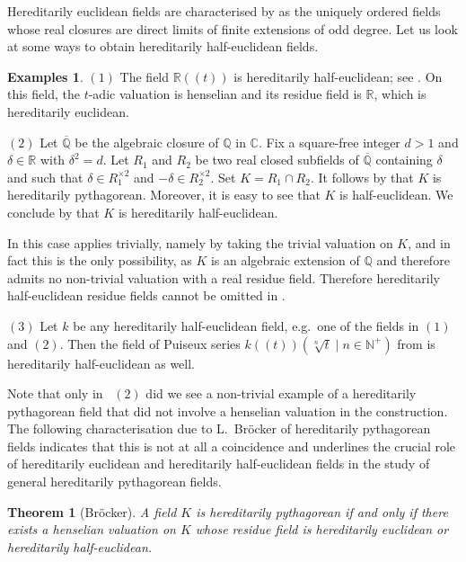 \documentclass[12pt,leqno]{amsart}
\newcommand{\qq}{\mathbb Q}
\newcommand{\cc}{\mathbb C}
\newcommand{\nat}{\mathbb{N}}
\newcommand{\rr}{\mathbb R}
\newcommand{\sq}[1]{#1^{\times 2}}
\newcommand{\ovl}{\overline}
\numberwithin{equation}{section}
\newtheorem{thm}[equation]{Theorem}
\theoremstyle{definition}
\newtheorem{exs}[equation]{Examples}
\theoremstyle{plain}
\begin{document}
Hereditarily euclidean fields are characterised by \cite[Satz 1.2]{PZ75} as the uniquely ordered fields whose real closures are direct limits of finite extensions of odd degree.
Let us look at some ways to obtain hereditarily half-euclidean fields.

\begin{exs}\label{EX:he}
$(1)$ The field $\rr(\!(t)\!)$ is hereditarily half-euclidean; see .
On this field, the $t$-adic valuation is henselian and its residue field is $\rr$, which is hereditarily euclidean.

$(2)$ Let $\ovl{\qq}$ be the algebraic closure of $\qq$ in $\cc$.
Fix a square-free integer $d>1$ and $\delta\in\rr$ with $\delta^2=d$.
Let $R_1$ and $R_2$ be two real closed subfields of $\ovl{\qq}$ containing $\delta$ and such that $\delta\in\sq{R}_1$ and $-\delta\in\sq{R}_2$.
Set $K=R_1\cap R_2$. It follows by \cite[Chap.~IV, Theorem~1]{Bec78} that $K$ is hereditarily pythagorean. 
Moreover, it is easy to see that $K$ is half-euclidean.
We conclude by  that $K$ is hereditarily half-euclidean. 

In this case  applies trivially, namely by taking the trivial valuation on $K$, and in fact this is the only possibility, as $K$ is an algebraic extension of $\qq$ and therefore admits no non-trivial valuation with a real residue field. 
Therefore hereditarily half-euclidean residue fields cannot be omitted in .

$(3)$ Let $k$ be any hereditarily half-euclidean field, e.g.~one of the fields in $(1)$ and $(2)$. Then the field of Puiseux series $k(\!(t)\!)(\sqrt[n]{t}\mid n\in\nat^+)$ from  is hereditarily half-euclidean as well.
\end{exs}

Note that only in ~$(2)$ did we see a non-trivial example of a hereditarily pythagorean field that did not involve a henselian valuation in the construction.
The following characterisation due to L.~Br\"ocker \cite{Bro76}
of hereditarily pythagorean fields indicates that this is not at all a coincidence and underlines the crucial role of hereditarily euclidean and hereditarily half-euclidean fields in the study of general hereditarily pythagorean fields.

\begin{thm}[Br\"ocker]
\label{T:HP-val}
A field $K$ is hereditarily pythagorean if and only if there exists a henselian valuation on $K$ whose residue field is hereditarily euclidean or hereditarily half-euclidean.
\end{thm}
\end{document}

